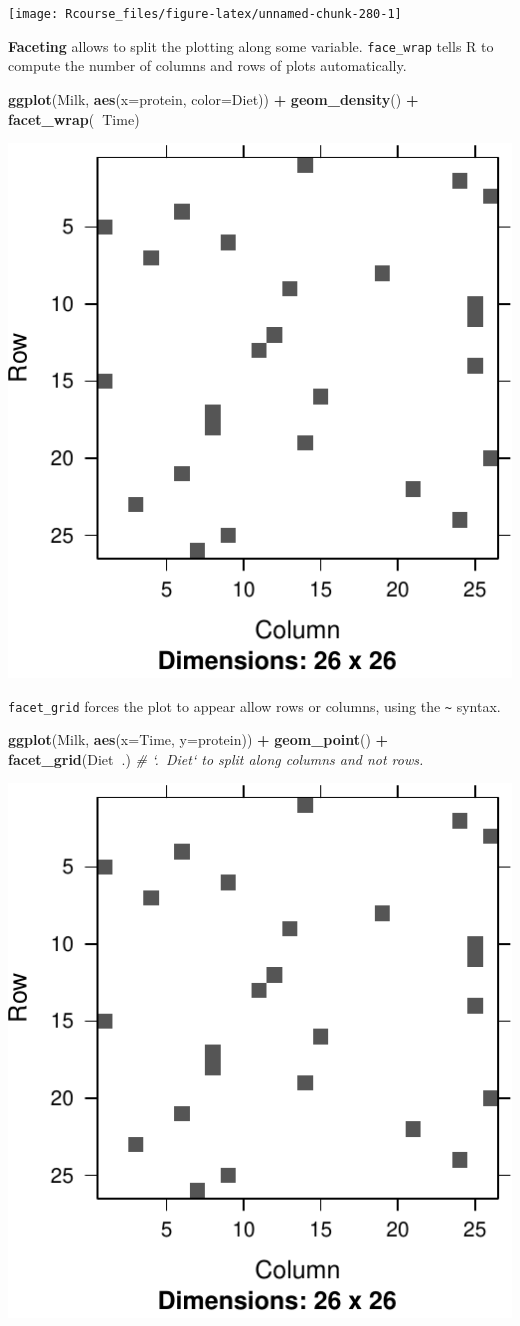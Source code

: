 \documentclass[]{book}
\newenvironment{Shaded}{\begin{snugshade}}{\end{snugshade}}
\newcommand{\KeywordTok}[1]{\textcolor[rgb]{0.13,0.29,0.53}{\textbf{#1}}}
\newcommand{\DataTypeTok}[1]{\textcolor[rgb]{0.13,0.29,0.53}{#1}}
\newcommand{\StringTok}[1]{\textcolor[rgb]{0.31,0.60,0.02}{#1}}
\newcommand{\CommentTok}[1]{\textcolor[rgb]{0.56,0.35,0.01}{\textit{#1}}}
\newcommand{\OperatorTok}[1]{\textcolor[rgb]{0.81,0.36,0.00}{\textbf{#1}}}
\newcommand{\NormalTok}[1]{#1}
\theoremstyle{definition}
\theoremstyle{definition}
\theoremstyle{definition}
\theoremstyle{remark}
\begin{document}
\texttt{[image: Rcourse\_files/figure-latex/unnamed-chunk-280-1]}

\textbf{Faceting} allows to split the plotting along some variable.
\texttt{face\_wrap} tells R to compute the number of columns and rows of
plots automatically.

\begin{Shaded}
\begin{Highlighting}[]
\KeywordTok{ggplot}\NormalTok{(Milk, }\KeywordTok{aes}\NormalTok{(}\DataTypeTok{x=}\NormalTok{protein, }\DataTypeTok{color=}\NormalTok{Diet)) }\OperatorTok{+}
\StringTok{  }\KeywordTok{geom_density}\NormalTok{() }\OperatorTok{+}
\StringTok{  }\KeywordTok{facet_wrap}\NormalTok{(}\OperatorTok{~}\NormalTok{Time)}
\end{Highlighting}
\end{Shaded}

\includegraphics[width=0.5\linewidth]{Rcourse_files/figure-latex/unnamed-chunk-281-1}

\texttt{facet\_grid} forces the plot to appear allow rows or columns,
using the \texttt{\textasciitilde{}} syntax.

\begin{Shaded}
\begin{Highlighting}[]
\KeywordTok{ggplot}\NormalTok{(Milk, }\KeywordTok{aes}\NormalTok{(}\DataTypeTok{x=}\NormalTok{Time, }\DataTypeTok{y=}\NormalTok{protein)) }\OperatorTok{+}
\StringTok{  }\KeywordTok{geom_point}\NormalTok{() }\OperatorTok{+}
\StringTok{  }\KeywordTok{facet_grid}\NormalTok{(Diet}\OperatorTok{~}\NormalTok{.) }\CommentTok{# `.~Diet` to split along columns and not rows.}
\end{Highlighting}
\end{Shaded}

\includegraphics[width=0.5\linewidth]{Rcourse_files/figure-latex/unnamed-chunk-282-1}
\end{document}
